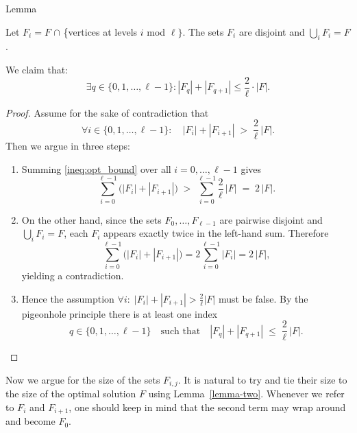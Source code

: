 \begin{mydefinition}{Lemma}
    \label{lemma-two}

    Let $F_i = F$ $\cap$ \{vertices at levels $i$ mod $\ell\}$. 
    The sets $F_i$ are disjoint and $\bigcup_i F_i = F$.

    We claim that: \[\exists q \in \{0, 1, \dots, \ell-1\}:
     |F_q| + |F_{q+1}| \leq \frac{2}{\ell} \cdot |F| \text{.}\]

\end{mydefinition}

\begin{proof}
    Assume for the sake of contradiction that
    \begin{equation}
        \forall i\in\{0,1,\dots,\ell-1\}:\quad
        |F_i| + |F_{i+1}| \;>\; \frac{2}{\ell}\,|F|.
        \label{ineq:opt_bound}
    \end{equation}
    Then we argue in three steps:
    \begin{enumerate}
      \item Summing \ref{ineq:opt_bound} over all \(i=0,\dots,\ell-1\) gives
        \[
          \sum_{i=0}^{\ell-1}\bigl(|F_i|+|F_{i+1}|\bigr)
          \;>\;
          \sum_{i=0}^{\ell-1}\frac{2}{\ell}\,|F|
          \;=\;
          2\,|F|.
        \]
      \item On the other hand, since the sets \(F_0,\dots,F_{\ell-1}\) are pairwise disjoint
        and \(\bigcup_iF_i=F\), each \(F_i\) appears exactly twice in the left-hand sum.  Therefore
        \[
          \sum_{i=0}^{\ell-1}\bigl(|F_i|+|F_{i+1}|\bigr)
          =2\sum_{i=0}^{\ell-1}|F_i|
          =2\,|F|,
        \]
        yielding a contradiction.
      \item Hence the assumption \(\forall i:\;|F_i|+|F_{i+1}|>\tfrac{2}{\ell}|F|\) must be false.  By the pigeonhole principle there is at least one index 
        \[
          q\in\{0,1,\dots,\ell-1\}
          \quad\text{such that}\quad
          |F_q| + |F_{q+1}|\;\le\;\frac{2}{\ell}\,|F|.
        \]
    \end{enumerate}
\end{proof}
    
Now we argue for the size of the sets $F_{i, j}$. It is natural to try and 
tie their size to the size of the optimal solution $F$ using Lemma~\ref{lemma-two}. 
Whenever we refer to $F_i$ and $F_{i+1}$,
one should keep in mind that the second term may wrap around and become $F_0$.

